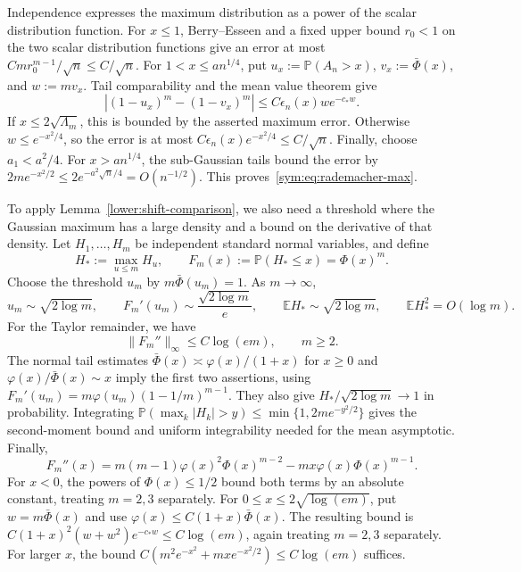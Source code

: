 \documentclass[11pt,letterpaper]{article}
\theoremstyle{remark}
\newcommand{\E}{\mathbb E}
\newcommand{\Pp}{\mathbb P}
\begin{document}
Independence expresses the maximum distribution as a power of the
scalar distribution function. For \(x\le1\),
Berry--Esseen and a fixed upper bound \(r_0<1\) on the two scalar
distribution functions give an error at most
\(Cm r_0^{m-1}/\sqrt n\le C/\sqrt n\). For
\(1<x\le an^{1/4}\), put \(u_x:=\Pp(A_n>x)\),
\(v_x:=\bar\Phi(x)\), and \(w:=mv_x\).
Tail comparability and the mean value theorem give
\[
 |(1-u_x)^m-(1-v_x)^m|\le C\epsilon_n(x)w e^{-c_*w}.
\]
If \(x\le2\sqrt{\Lambda_m}\), this is bounded by the asserted
maximum error. Otherwise \(w\le e^{-x^2/4}\), so the error is
at most \(C\epsilon_n(x)e^{-x^2/4}\le C/\sqrt n\).
Finally, choose \(a_1<a^2/4\). For \(x>an^{1/4}\), the
sub-Gaussian tails bound the error by
\(2m e^{-x^2/2}\le2e^{-a^2\sqrt n/4}=O(n^{-1/2})\).
This proves~\eqref{sym:eq:rademacher-max}.

To apply Lemma~\ref{lower:shift-comparison}, we also need a threshold
where the Gaussian maximum has a large density and a bound on the
derivative of that density. Let \(H_1,\ldots,H_m\) be independent
standard normal variables, and define
\[
 H_*:=\max_{u\le m}H_u,\qquad F_m(x):=\Pp(H_*\le x)=\Phi(x)^m.
\]
Choose the threshold \(u_m\) by \(m\bar\Phi(u_m)=1\).
As \(m\to\infty\),
\begin{equation}
 u_m\sim\sqrt{2\log m},\qquad
 F_m'(u_m)\sim\frac{\sqrt{2\log m}}e,\qquad
 \E H_*\sim\sqrt{2\log m},\qquad \E H_*^2=O(\log m).
 \label{sym:eq:gaussian-max}
\end{equation}
For the Taylor remainder, we have
\begin{equation}
 \|F_m''\|_\infty\le C\log(em),\qquad m\ge2.
 \label{sym:eq:gaussian-smoothness}
\end{equation}
The normal tail estimates
\(\bar\Phi(x)\asymp\varphi(x)/(1+x)\) for \(x\ge0\) and
\(\varphi(x)/\bar\Phi(x)\sim x\) imply the first two assertions,
using \(F_m'(u_m)=m\varphi(u_m)(1-1/m)^{m-1}\).
They also give \(H_*/\sqrt{2\log m}\to1\) in probability.
Integrating \(\Pp(\max_k|H_k|>y)\le\min\{1,2me^{-y^2/2}\}\)
gives the second-moment bound and uniform integrability needed for
the mean asymptotic. Finally,
\[
 F_m''(x)=m(m-1)\varphi(x)^2\Phi(x)^{m-2}
             -mx\varphi(x)\Phi(x)^{m-1}.
\]
For \(x<0\), the powers of \(\Phi(x)\le1/2\) bound both terms
by an absolute constant, treating \(m=2,3\) separately. For
\(0\le x\le2\sqrt{\log(em)}\), put \(w=m\bar\Phi(x)\) and use
\(\varphi(x)\le C(1+x)\bar\Phi(x)\). The resulting bound is
\(C(1+x)^2(w+w^2)e^{-c_*w}\le C\log(em)\), again treating
\(m=2,3\) separately. For larger \(x\), the bound
\(C(m^2e^{-x^2}+mx e^{-x^2/2})\le C\log(em)\) suffices.
\end{document}
